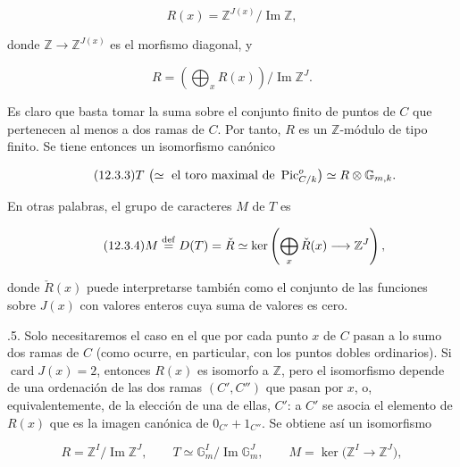 \begin{equation}\tag{12.3.1}
 R(x)=\mathbb Z^{J(x)}/\operatorname{Im}\mathbb Z,
\end{equation}

\noindent
donde $\mathbb Z\to\mathbb Z^{J(x)}$ es el morfismo diagonal, y

\begin{equation}\tag{12.3.2}
 R=\left(\bigoplus_x R(x)\right)/\operatorname{Im}\mathbb Z^J.
\end{equation}

\noindent
Es claro que basta tomar la suma sobre el conjunto finito de puntos de
$C$ que pertenecen al menos a dos ramas de $C$. Por tanto, $R$ es un
$\mathbb Z$-módulo de tipo finito. Se tiene entonces un isomorfismo
canónico

\begin{equation}\tag{\sisi{12.2.3}{12.3.3}}
 T\ \bigl(\simeq\text{ el toro maximal de }
       \underline{\operatorname{Pic}}^o_{C/k}\bigr)
 \simeq R\otimes\mathbb G_{m,k}.
\end{equation}

\noindent
En otras palabras, el grupo de caracteres $M$ de $T$ es

\begin{equation}\tag{\sisi{12.2.4}{12.3.4}}
 M\mathrel{\mathop{=}^{\mathrm{def}}}D(T)=\check R
 \simeq\ker\left(\bigoplus_x\check R(x)\longrightarrow\mathbb Z^J\right),
\end{equation}

\noindent
donde $\check R(x)$ puede interpretarse también como el conjunto de las
funciones sobre $J(x)$ con valores enteros cuya suma de valores es cero.


\medskip
{}.5. Solo necesitaremos el caso en el que por cada punto $x$ de $C$
pasan a lo sumo dos ramas de $C$ (como ocurre, en particular, con los
puntos dobles ordinarios). Si $\operatorname{card}J(x)=2$, entonces
$R(x)$ es isomorfo a $\mathbb Z$, pero el isomorfismo depende de una
ordenación de las dos ramas $(C',C'')$ que pasan por $x$, o,
equivalentemente, de la elección de una de ellas, $C'$: a $C'$ se asocia
el elemento de $R(x)$ que es la imagen canónica de
$0_{C'}+1_{C''}$. Se obtiene así un isomorfismo

\begin{equation}\tag{12.3.6}
 R=\mathbb Z^I/\operatorname{Im}\mathbb Z^J,
 \qquad
 T\simeq\mathbb G_m^I/\operatorname{Im}\mathbb G_m^J,
 \qquad
 M=\ker\bigl(\mathbb Z^I\longrightarrow\mathbb Z^J\bigr),
\end{equation}

